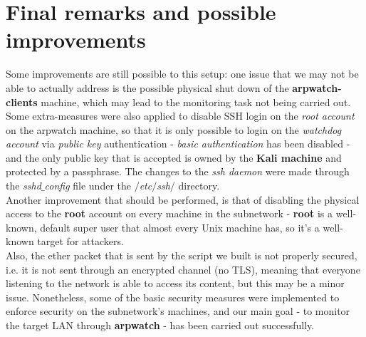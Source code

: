 \section{Final remarks and possible improvements}
Some improvements are still possible to this setup: one issue that we may not be able to actually address is the possible physical shut down of the \textbf{arpwatch-clients} machine, which may lead to the monitoring task not being carried out.\\
Some extra-measures were also applied to disable SSH login on the \textit{root account} on the arpwatch machine, so that it is only possible to login on the \textit{watchdog account} via \textit{public key} authentication - \textit{basic authentication} has been disabled - and the only public key that is accepted is owned by the \textbf{Kali machine} and protected by a passphrase. The changes to the \textit{ssh daemon} were made through the \textit{sshd$\_$config} file under the \textit{$/$etc$/$ssh$/$} directory.\\
Another improvement that should be performed, is that of disabling the physical access to the \textbf{root} account on every machine in the subnetwork - \textbf{root} is a well-known, default super user that almost every Unix machine has, so it's a well-known target for attackers.\\
Also, the ether packet that is sent by the script we built is not properly secured, i.e. it is not sent through an encrypted channel (no TLS), meaning that everyone listening to the network is able to access its content, but this may be a minor issue.
Nonetheless, some of the basic security measures were implemented to enforce security on the subnetwork's machines, and our main goal - to monitor the target LAN through \textbf{arpwatch} - has been carried out successfully.
